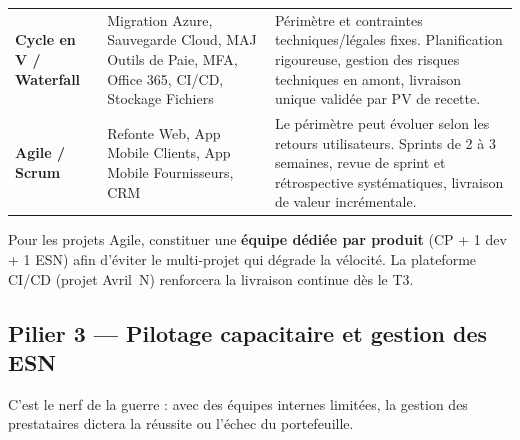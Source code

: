 \documentclass[11pt,a4paper,oneside]{report}
\begin{document}
\vspace{4pt}
\begin{center}
\renewcommand{\arraystretch}{1.5}
\begin{tabularx}{\textwidth}{C{2.8cm} L{5cm} L{6.5cm}}
\toprule
{}
 &  &  \\
\midrule
\textbf{Cycle en V / Waterfall} & Migration Azure, Sauvegarde Cloud, MAJ Outils de Paie, MFA, Office 365, CI/CD, Stockage Fichiers & Périmètre et contraintes techniques/légales fixes. Planification rigoureuse, gestion des risques techniques en amont, livraison unique validée par PV de recette. \\
\textbf{Agile / Scrum} & Refonte Web, App Mobile Clients, App Mobile Fournisseurs, CRM & Le périmètre peut évoluer selon les retours utilisateurs. Sprints de 2 à 3 semaines, revue de sprint et rétrospective systématiques, livraison de valeur incrémentale. \\
\bottomrule
\end{tabularx}
\end{center}

\begin{reco}
Pour les projets Agile, constituer une \textbf{équipe dédiée par produit} (CP + 1 dev + 1 ESN) afin d'éviter le multi-projet qui dégrade la vélocité. La plateforme CI/CD (projet Avril~N) renforcera la livraison continue dès le T3.
\end{reco}

\subsection{Pilier 3 — Pilotage capacitaire et gestion des ESN}

C'est le nerf de la guerre : avec des équipes internes limitées, la gestion des prestataires dictera la réussite ou l'échec du portefeuille.
\end{document}
